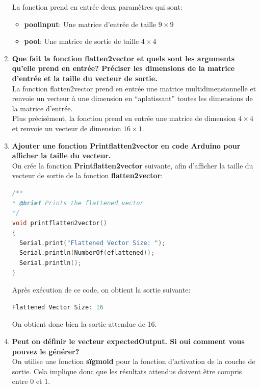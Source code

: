 \documentclass[a4paper, 12pt, openany]{book}
\begin{document}
\begin{enumerate}
{    La fonction prend en entrée deux paramètres qui sont:
    \begin{itemize}
      \item \textbf{poolinput}: Une matrice d'entrée de taille $9 \times 9$
      \item \textbf{pool}: Une matrice de sortie de taille $4 \times 4$ \\
    \end{itemize}
  } \newpage
  \item {
    \textbf{Que fait la fonction flatten2vector et quels sont les arguments qu'elle prend en entrée? Préciser les dimensions de 
    la matrice d'entrée et la taille du vecteur de sortie.} \vspace{0.2cm}\\ 
    La fonction flatten2vector prend en entrée une matrice multidimensionnelle et renvoie un vecteur à une dimension en ``aplatissant'' toutes les dimensions de la matrice d'entrée. \\
    Plus précisément, la fonction prend en entrée une matrice de dimension $4\times 4$ et renvoie un vecteur de dimension $16\times 1$.
  } 
  \item {
    \textbf{Ajouter une fonction Printflatten2vector en code Arduino pour afficher la taille du vecteur.} \vspace{0.2cm} \\ 
    On crée la fonction \textbf{Printflatten2vector} suivante, afin d'afficher la taille du vecteur de sortie de la fonction \textbf{flatten2vector}:
    \begin{lstlisting}[language=C]
/**
* @brief Prints the flattened vector
*/
void printflatten2vector()
{
  Serial.print("Flattened Vector Size: ");
  Serial.println(NumberOf(eflattened));
  Serial.println();
}
    \end{lstlisting}
    Après exécution de ce code, on obtient la sortie suivante:
    \begin{lstlisting}[language=C]
Flattened Vector Size: 16
    \end{lstlisting}
    On obtient donc bien la sortie attendue de 16.
  } 
  \item {
    \textbf{Peut on définir le vecteur expectedOutput. Si oui comment vous pouvez le générer?} \vspace{0.2cm} \\
    On utilise une fonction \textbf{sïgmoid} pour la fonction d'activation de la couche de sortie. 
    Cela implique donc que les résultats attendus doivent être compris entre 0 et 1. \\
}
\end{enumerate}
\end{document}
